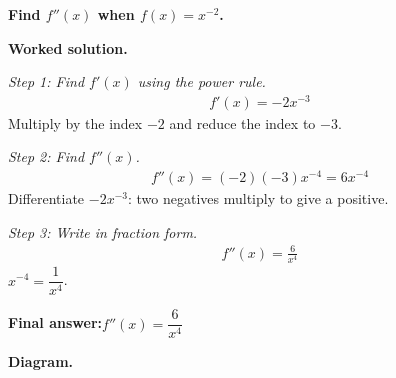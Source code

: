 \documentclass[11pt]{article}
\newcommand{\question}[1]{\par\medskip\noindent\textbf{#1}\par}
\begin{document}
\question{Find \( f''(x) \) when \( f(x) = x^{-2} \).}

\textbf{Worked solution.}

\textit{Step 1: Find \( f'(x) \) using the power rule.}
\[\begin{gathered}
f'(x) = -2x^{-3}
\end{gathered}\]
Multiply by the index \(-2\) and reduce the index to \(-3\).

\textit{Step 2: Find \( f''(x) \).}
\[\begin{gathered}
f''(x) = (-2)(-3)x^{-4} = 6x^{-4}
\end{gathered}\]
Differentiate \(-2x^{-3}\): two negatives multiply to give a positive.

\textit{Step 3: Write in fraction form.}
\[\begin{gathered}
f''(x) = \frac{6}{x^4}
\end{gathered}\]
\( x^{-4} = \dfrac{1}{x^4} \).

\begin{answerbox}
\textbf{Final answer:}\quad \(\displaystyle  f''(x) = \dfrac{6}{x^4} \)
\end{answerbox}
\textbf{Diagram.}
\end{document}
